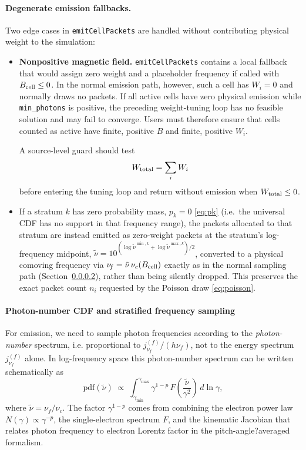 \documentclass[12pt,a4paper]{article}
\newcommand{\nuth}{\tilde{\nu}}
\newcommand{\nuf}{\nu_{\!f}}
\newcommand{\nuc}{\nu_c}
\newcommand{\gmin}{\gamma_{\min}}
\newcommand{\gmax}{\gamma_{\max}}
\newcommand{\code}[1]{\texttt{#1}}
\begin{document}
\paragraph{Degenerate emission fallbacks.}
Two edge cases in \code{emitCellPackets} are handled without contributing
physical weight to the simulation:
\begin{itemize}
	\item \textbf{Nonpositive magnetic field.}
	\code{emitCellPackets} contains a local fallback that would assign
	zero weight and a placeholder frequency if called with
	$B_{\rm cell}\le0$. In the normal emission path, however, such a cell has
	$W_i=0$ and normally draws no packets. If all active cells have zero
	physical emission while \code{min\_photons} is positive, the preceding
	weight-tuning loop has no feasible solution and may fail to converge.
	Users must therefore ensure that cells counted as active have finite,
	positive $B$ and finite, positive $W_i$.
	
	A source-level guard should test
	\begin{equation}
		W_{\rm total}
		=
		\sum_iW_i
	\end{equation}
	before entering the tuning loop and return without emission when
	$W_{\rm total}\le0$.
	
	\item If a stratum $k$ has zero probability mass, $p_k = 0$
	\eqref{eq:pk} (i.e.\ the universal CDF has no support in that
	frequency range), the packets allocated to that stratum are instead
	emitted as zero-weight packets at the stratum's log-frequency
	midpoint, $\nuth = 10^{(\log\nuth^{\min,k}+\log\nuth^{\max,k})/2}$,
	converted to a physical comoving frequency via
	$\nuf = \nuth\,\nuc(B_{\rm cell})$ exactly as in the normal sampling
	path (Section~\ref{sec:strata}), rather than being silently dropped.
	This preserves the exact packet count $n_i$ requested by the Poisson
	draw \eqref{eq:poisson}.
\end{itemize}

\paragraph{Photon-number CDF and stratified frequency sampling}
\label{sec:strata}

For emission, we need to sample photon frequencies according to the
\emph{photon-number} spectrum, i.e. proportional to
\(j_{\nuf}^{(f)}/(h\nuf)\), not to the energy spectrum \(j_{\nuf}^{(f)}\)
alone. In log-frequency space this photon-number spectrum can be written
schematically as
\begin{equation}
	\mathrm{pdf}(\nuth)
	\;\propto\;
	\int_{\gmin}^{\gmax}
	\gamma^{1-p}\,
	F\!\left(\frac{\nuth}{\gamma^2}\right)\,d\ln\gamma,
	\label{eq:pdf_nu}
\end{equation}
where \(\nuth = \nuf/\nuc\). The factor \(\gamma^{1-p}\) comes from
combining the electron power law \(N(\gamma)\propto\gamma^{-p}\), the
single-electron spectrum \(F\), and the kinematic Jacobian that relates
photon frequency to electron Lorentz factor in the pitch-angle?averaged
formalism.
\end{document}
